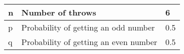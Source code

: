 \begin{tabular}{|l|l|l|}\hline
n	&Number of throws	&6\\\hline
p	&Probability of getting an odd number	&0.5\\\hline
q	&Probability of getting an even number	&0.5\\\hline
\end{tabular}
